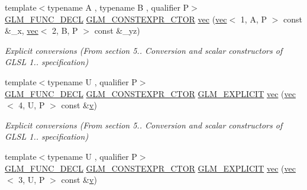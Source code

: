 \begin{DoxyCompactItemize}
{\footnotesize template$<$typename A , typename B , qualifier P$>$ }\\\mbox{\hyperlink{setup_8hpp_ab2d052de21a70539923e9bcbf6e83a51}{G\+L\+M\+\_\+\+F\+U\+N\+C\+\_\+\+D\+E\+CL}} \mbox{\hyperlink{setup_8hpp_ad34178a09666081abdb573c14d1f4a5a}{G\+L\+M\+\_\+\+C\+O\+N\+S\+T\+E\+X\+P\+R\+\_\+\+C\+T\+OR}} \mbox{\hyperlink{structglm_1_1vec_3_013_00_01_t_00_01_q_01_4_a40cfee6d5aafeb1fe818ae483fad24a3}{vec}} (\mbox{\hyperlink{structglm_1_1vec}{vec}}$<$ 1, A, P $>$ const \&\+\_\+x, \mbox{\hyperlink{structglm_1_1vec}{vec}}$<$ 2, B, P $>$ const \&\+\_\+yz)
\begin{DoxyCompactList}\small\item\em Explicit conversions (From section 5.. Conversion and scalar constructors of G\+L\+SL 1.. specification) \end{DoxyCompactList}\item 
{\footnotesize template$<$typename U , qualifier P$>$ }\\\mbox{\hyperlink{setup_8hpp_ab2d052de21a70539923e9bcbf6e83a51}{G\+L\+M\+\_\+\+F\+U\+N\+C\+\_\+\+D\+E\+CL}} \mbox{\hyperlink{setup_8hpp_ad34178a09666081abdb573c14d1f4a5a}{G\+L\+M\+\_\+\+C\+O\+N\+S\+T\+E\+X\+P\+R\+\_\+\+C\+T\+OR}} \mbox{\hyperlink{setup_8hpp_a6c74f5a5e7b134ab69023ff9a30d4d5d}{G\+L\+M\+\_\+\+E\+X\+P\+L\+I\+C\+IT}} \mbox{\hyperlink{structglm_1_1vec_3_013_00_01_t_00_01_q_01_4_a6a3c6e504114be5310317d725eda50ea}{vec}} (\mbox{\hyperlink{structglm_1_1vec}{vec}}$<$ 4, U, P $>$ const \&\mbox{\hyperlink{_s_d_l__opengl_8h_a10a82eabcb59d2fcd74acee063775f90}{v}})
\begin{DoxyCompactList}\small\item\em Explicit conversions (From section 5.. Conversion and scalar constructors of G\+L\+SL 1.. specification) \end{DoxyCompactList}\item 
{\footnotesize template$<$typename U , qualifier P$>$ }\\\mbox{\hyperlink{setup_8hpp_ab2d052de21a70539923e9bcbf6e83a51}{G\+L\+M\+\_\+\+F\+U\+N\+C\+\_\+\+D\+E\+CL}} \mbox{\hyperlink{setup_8hpp_ad34178a09666081abdb573c14d1f4a5a}{G\+L\+M\+\_\+\+C\+O\+N\+S\+T\+E\+X\+P\+R\+\_\+\+C\+T\+OR}} \mbox{\hyperlink{setup_8hpp_a6c74f5a5e7b134ab69023ff9a30d4d5d}{G\+L\+M\+\_\+\+E\+X\+P\+L\+I\+C\+IT}} \mbox{\hyperlink{structglm_1_1vec_3_013_00_01_t_00_01_q_01_4_a47d23576cd135fb6f6b964ed9d4e3599}{vec}} (\mbox{\hyperlink{structglm_1_1vec}{vec}}$<$ 3, U, P $>$ const \&\mbox{\hyperlink{_s_d_l__opengl_8h_a10a82eabcb59d2fcd74acee063775f90}{v}})

\end{DoxyCompactItemize}
